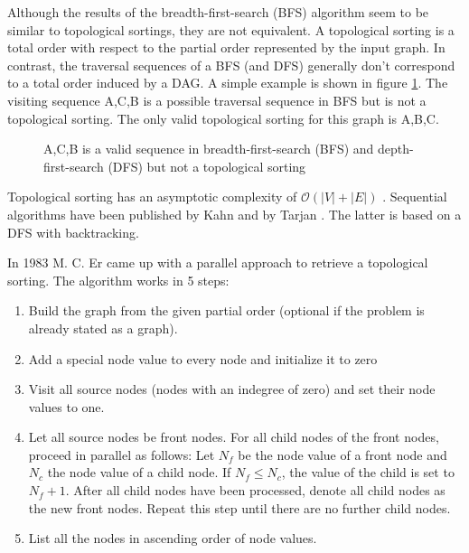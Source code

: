Although the results of the breadth-first-search (BFS) algorithm seem to be similar to topological sortings, they are not equivalent. A topological sorting is a total order with respect to the partial order represented by the input graph. In contrast, the traversal sequences of a BFS (and DFS) generally don’t correspond to a total order induced by a DAG. A simple example is shown in figure \ref{fig:diff-bfs}. The visiting sequence A,C,B is a possible traversal sequence in BFS but is not a topological sorting. The only valid topological sorting for this graph is A,B,C.


\begin{figure}[!hbp]
\centering
 

\caption{A,C,B is a valid sequence in breadth-first-search (BFS) and depth-first-search (DFS) but not a topological sorting}
\label{fig:diff-bfs}
\end{figure}

Topological sorting has an asymptotic complexity of $\mathcal{O}(|V|+|E|)$ \cite[Chapter~22.4]{cormen2001introduction}. Sequential algorithms have been published by Kahn \cite{kahn1962topological} and by Tarjan  \cite{tarjan1976edge}. The latter is based on a DFS with backtracking.

 In 1983 M. C. Er \cite{er1983parallel} came up with a parallel approach to retrieve a topological sorting. The algorithm works in 5 steps:
 \begin{enumerate}
        \item Build the graph from the given partial order (optional if the problem is already stated as a graph).
        \item Add a special node value to every node and initialize it to zero
        \item Visit all source nodes (nodes with an indegree of zero) and set their node values to one.
        \item Let all source nodes be front nodes. For all child nodes of the front nodes, proceed in parallel as follows: Let $N_f$ be the node value of a front node and $N_c$ the node value of a child node. If $N_f \leq N_c$, the value of the child is set to $N_f + 1$. After all child nodes have been processed, denote all child nodes as the new front nodes. Repeat this step until there are no further child nodes. 
        \item List all the nodes in ascending order of node values.
 \end{enumerate}
 
